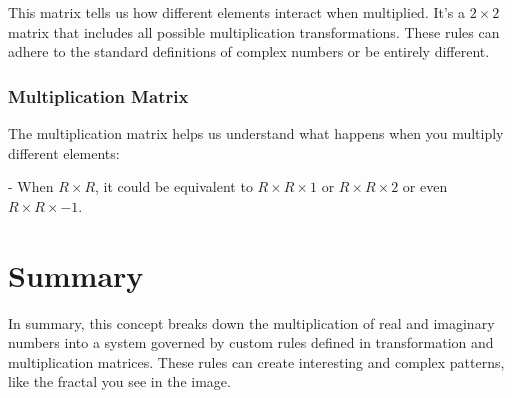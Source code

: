 \documentclass{article}
\begin{document}
This matrix tells us how different elements interact when multiplied. It's a \( 2 \times 2 \) matrix that includes all possible multiplication transformations. These rules can adhere to the standard definitions of complex numbers or be entirely different.

\subsubsection*{Multiplication Matrix}

The multiplication matrix helps us understand what happens when you multiply different elements:

- When \( R \times R \), it could be equivalent to \( R \times R \times 1 \) or \( R \times R \times 2 \) or even \( R \times R \times -1 \).

\section*{Summary}

In summary, this concept breaks down the multiplication of real and imaginary numbers into a system governed by custom rules defined in transformation and multiplication matrices. These rules can create interesting and complex patterns, like the fractal you see in the image.
\end{document}
